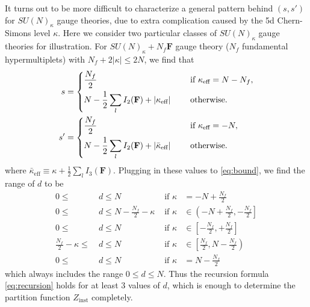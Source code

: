 \documentclass[letterpaper, 11pt]{article}
\newcommand{\nn}{\nonumber}
\def\k{\kappa}
\def\half{\frac{1}{2}}
\begin{document}
{It turns out to be more difficult to characterize a general pattern behind $(s, s')$ for $SU(N)_\kappa$ gauge theories, due to extra complication caused by the 5d Chern-Simons level $\kappa$. Here we consider two particular classes of $SU(N)_\kappa$ gauge theories for illustration.  For $SU(N)_\kappa + N_f\mathbf{F}$ gauge theory ($N_f$ fundamental hypermultiplets) with $N_f + 2|\kappa| \leq 2N$, we find that 
\begin{align}
  \label{eq:sun-nf}
  s &= \begin{dcases}
   \frac{N_f}{2}
  &  \quad \text{ if }  \kappa_\text{eff} = N - N_f, \\
  N - \frac{1}{2} \sum_{l}I_2(\mathbf{F}) + |\k_\text{eff}| 
  &  \quad  \textstyle\text{ otherwise}.
  \end{dcases}\\
  s' &=
    \begin{dcases}
      \frac{N_f}{2}
     & \quad \textstyle\text{ if }  \kappa_\text{eff} = -N, \\
     N - \frac{1}{2} \sum_{l}I_2(\mathbf{F}) + \left|\bar{\k}_\text{eff}\right| 
     & \quad \textstyle\text{ otherwise} .
    \end{dcases}  
\end{align}
where $\bar{\k}_\text{eff} \equiv \k + \half \sum_l I_3 (\mathbf{F}) $. 
Plugging in these values to \eqref{eq:bound}, we find the range of $d$ to be
\begin{align}
  \label{eq:sun-nf-range}
  0 \leq &\ d \leq N &\text{ if } \kappa &= -N + \frac{N_f}{2} \nn \\
  0 \leq &\ d \leq N-\frac{N_f}{2}-\kappa &\text{ if } \kappa & \in \left(-N +\frac{N_f}{2}, -\frac{N_f}{2} \right] \nn \\
  0 \leq &\ d \leq N &\text{ if } \kappa &\in \left[-\frac{N_f}{2}, +\frac{N_f}{2}\right] \\
  \frac{N_f}{2}-\kappa \leq &\ d \leq N & \text{ if } \kappa &\in \left[\frac{N_f}{2}, N -\frac{N_f}{2}\right)  \nn \\
  0 \leq &\ d \leq N & \text{ if } \kappa &= N -\frac{N_f}{2}  \nn 
\end{align}
which always includes the range $0 \leq d \leq N$. Thus the recursion formula \eqref{eq:recursion} holds for at least $3$ values of $d$, which is enough to determine the partition function $Z_{\text{inst}}$ completely.

}
\end{document}
